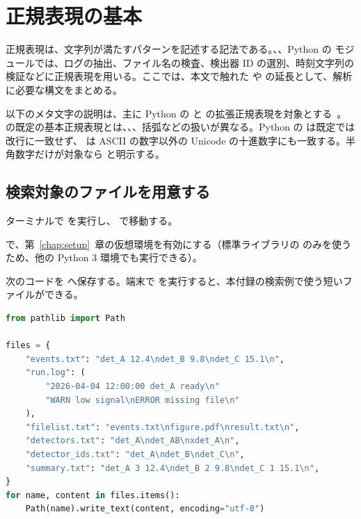\chapter{正規表現の基本}
\label{app:regex}

正規表現は、文字列が満たすパターンを記述する記法である。、、Python の  モジュールでは、ログの抽出、ファイル名の検査、検出器 ID の選別、時刻文字列の検証などに正規表現を用いる。ここでは、本文で触れた  や  の延長として、解析に必要な構文をまとめる。

以下のメタ文字の説明は、主に Python の  と  の拡張正規表現を対象とする~\cite{python_re,grep_manual}。 の既定の基本正規表現とは、\code{+}、、括弧などの扱いが異なる。Python の  は既定では改行に一致せず、 は ASCII の数字以外の Unicode の十進数字にも一致する。半角数字だけが対象なら \code{[0-9]} と明示する。

\section{検索対象のファイルを用意する}

ターミナルで  を実行し、 で移動する。

 で、第~\ref{chap:setup}~章の仮想環境を有効にする（標準ライブラリの  のみを使うため、他の Python 3 環境でも実行できる）。

次のコードを  へ保存する。端末で  を実行すると、本付録の検索例で使う短いファイルができる。

\begin{lstlisting}[language=Python]
from pathlib import Path

files = {
    "events.txt": "det_A 12.4\ndet_B 9.8\ndet_C 15.1\n",
    "run.log": (
        "2026-04-04 12:00:00 det_A ready\n"
        "WARN low signal\nERROR missing file\n"
    ),
    "filelist.txt": "events.txt\nfigure.pdf\nresult.txt\n",
    "detectors.txt": "det_A\ndet_AB\nxdet_A\n",
    "detector_ids.txt": "det_A\ndet_B\ndet_C\n",
    "summary.txt": "det_A 3 12.4\ndet_B 2 9.8\ndet_C 1 15.1\n",
}
for name, content in files.items():
    Path(name).write_text(content, encoding="utf-8")
\end{lstlisting}

